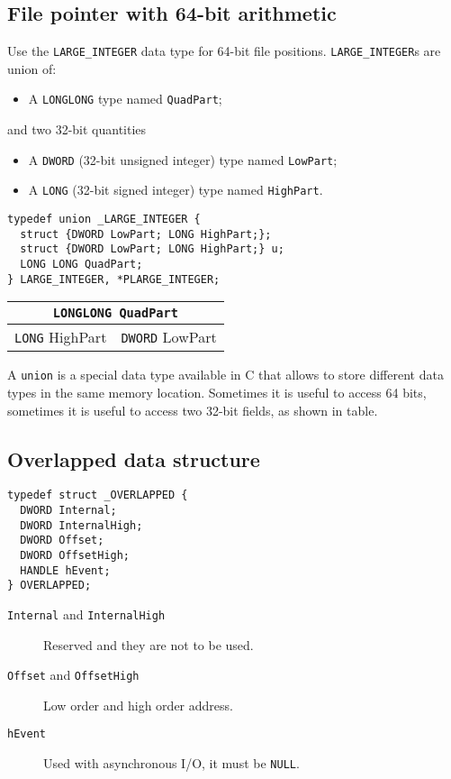 \subsection{File pointer with 64-bit arithmetic}
Use the \texttt{LARGE\_INTEGER} data type for 64-bit file positions. \texttt{LARGE\_INTEGER}s are union of:
\begin{itemize}
\item A \texttt{LONGLONG} type named \texttt{QuadPart};
\end{itemize}
and two 32-bit quantities
\begin{itemize}
\item A \texttt{DWORD} (32-bit unsigned integer) type named \texttt{LowPart};
\item A \texttt{LONG} (32-bit signed integer) type named \texttt{HighPart}.
\end{itemize}

\begin{verbatim}
typedef union _LARGE_INTEGER {
  struct {DWORD LowPart; LONG HighPart;};
  struct {DWORD LowPart; LONG HighPart;} u;
  LONG LONG QuadPart;
} LARGE_INTEGER, *PLARGE_INTEGER;
\end{verbatim}

\begin{center}
\begin{tabular}{|c|c|}
\hline
\multicolumn{2}{|c|}{\texttt{LONGLONG QuadPart}} \\
\hline
\texttt{LONG} HighPart & \texttt{DWORD} LowPart \\
\hline
\end{tabular}
\end{center}

A \texttt{union} is a special data type available in C that allows to store different data types in the same memory location. Sometimes it is useful to access 64 bits, sometimes it is useful to access two 32-bit fields, as shown in table.

\subsection{Overlapped data structure}
\begin{verbatim}
typedef struct _OVERLAPPED {
  DWORD Internal;
  DWORD InternalHigh;
  DWORD Offset;
  DWORD OffsetHigh;
  HANDLE hEvent;
} OVERLAPPED;
\end{verbatim}

\begin{description}
\item [\texttt{Internal} and \texttt{InternalHigh}] Reserved and they are not to be used.
\item [\texttt{Offset} and \texttt{OffsetHigh}] Low order and high order address.
\item [\texttt{hEvent}] Used with asynchronous I/O, it must be \texttt{NULL}.
\end{description}

